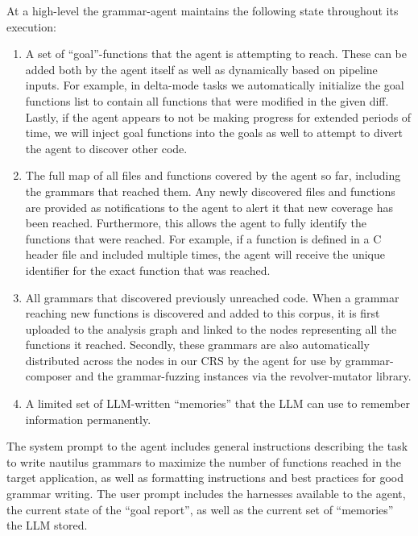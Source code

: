         At a high-level the grammar-agent maintains the following state throughout its execution:

        \begin{enumerate}
        \item A set of ``goal''-functions that the agent is attempting to reach. These can be added both by the agent itself as well as dynamically based on pipeline inputs.
        For example, in delta-mode tasks we automatically initialize the goal functions list to contain all functions that were modified in the given diff.
        Lastly, if the agent appears to not be making progress for extended periods of time, we will inject goal functions into the goals as well to attempt to divert the agent to discover other code.

        \item The full map of all files and functions covered by the agent so far, including the grammars that reached them.
        Any newly discovered files and functions are provided as notifications to the agent to alert it that new coverage has been reached.
        Furthermore, this allows the agent to fully identify the functions that were reached.
        For example, if a function is defined in a C header file and included multiple times, the agent will receive the unique identifier for the exact function that was reached.

        \item All grammars that discovered previously unreached code.
        When a grammar reaching new functions is discovered and added to this corpus, it is first uploaded to the analysis graph and linked to the nodes representing all the functions it reached.
        Secondly, these grammars are also automatically distributed across the nodes in our CRS by the \seedsync agent for use by grammar-composer and the grammar-fuzzing instances via the revolver-mutator library.

        \item A limited set of LLM-written ``memories'' that the LLM can use to remember information permanently.

        \end{enumerate}

        The system prompt to the agent includes general instructions describing the task to write nautilus grammars to maximize the number of functions reached in the target application, as well as formatting instructions and best practices for good grammar writing.
        The user prompt includes the harnesses available to the agent, the current state of the ``goal report'', as well as the current set of ``memories'' the LLM stored.

